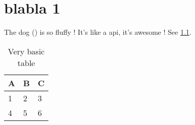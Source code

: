 \chapter{blabla 1}


The dog () is so fluffy !
It's like a \gls{api}, it's awesome ! See \cref{tab:abc}.

\begin{table}[h]
    \centering
    \begin{tabular}{l | l | l}
        A & B & C \\
        \hline
        1 & 2 & 3 \\
        4 & 5 & 6
    \end{tabular}
    \caption{Very basic table}
    \label{tab:abc}
\end{table}

\lipsum[1-20]